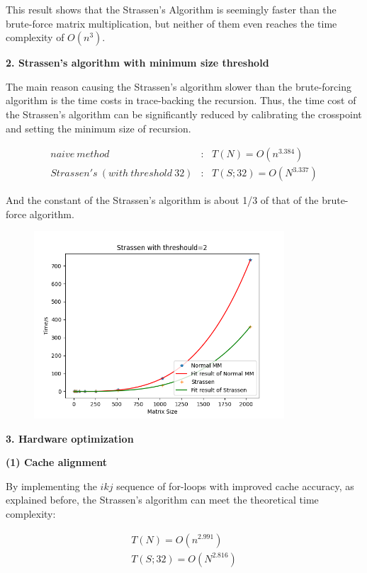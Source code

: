 \documentclass[UTF8]{ctexart}
\begin{document}
This result shows that the Strassen's Algorithm is seemingly faster than
the brute-force matrix multiplication, but neither of them even reaches
the time complexity of \(O(n^3)\).

\textbf{2. Strassen's algorithm with minimum size threshold}

The main reason causing the Strassen's algorithm slower than the
brute-forcing algorithm is the time costs in trace-backing the
recursion. Thus, the time cost of the Strassen's algorithm can be
significantly reduced by calibrating the crosspoint and setting the
minimum size of recursion.

\begin{equation}
  \begin{aligned}
    naive\ method                     & :\ \ \ T(N)=O(n^{3.384})    \\
    Strassen's\ (with\ threshold\ 32) & :\ \ \ T(S;32)=O(N^{3.337})
  \end{aligned}
\end{equation}

And the constant of the Strassen's algorithm is about 1/3 of that of the
brute-force algorithm.

\begin{figure}[htb]
  \centering
  \includegraphics[height=7.0cm]{../ppt/slide-UIBK/th=64.png}
  \caption{}
\end{figure}

\textbf{3. Hardware optimization}

\textbf{(1) Cache alignment}

By implementing the \(ikj\) sequence of for-loops with improved cache
accuracy, as explained before, the Strassen's algorithm can meet the
theoretical time complexity:

\begin{equation}
  \begin{aligned}
    T(N)=O(n^{2.991}) \\
    T(S;32)=O(N^{2.816})
  \end{aligned}
\end{equation}
\end{document}
